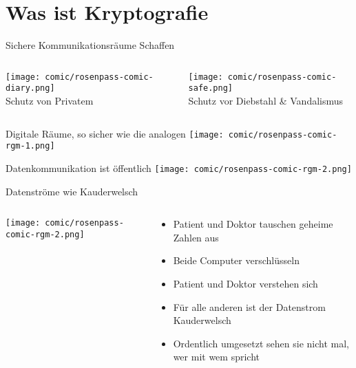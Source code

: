 \section{Was ist Kryptografie}


\begin{frame}[T]{Sichere Kommunikationsräume Schaffen}
  \begin{columns}[t,fullwidth]
    \hfill
    \begin{column}{.35\linewidth}
      \centering
      \texttt{[image: comic/rosenpass-comic-diary.png]}   
      \\ Schutz von Privatem
    \end{column}
    \begin{column}{.55\linewidth}
      \centering
      \texttt{[image: comic/rosenpass-comic-safe.png]}   
      \\ Schutz vor Diebstahl \& Vandalismus
    \end{column}
    \hfill
  \end{columns}
\end{frame}

\begin{frame}[T]{Digitale Räume, so sicher wie die analogen}
  \texttt{[image: comic/rosenpass-comic-rgm-1.png]}
\end{frame}

\begin{frame}[T]{Datenkommunikation ist öffentlich}
  \texttt{[image: comic/rosenpass-comic-rgm-2.png]}
\end{frame}

\begin{frame}[T]{Datenströme wie Kauderwelsch}
  \begin{columns}[T,fullwidth]
    \hfill
    \begin{column}{.55\linewidth}
      \texttt{[image: comic/rosenpass-comic-rgm-2.png]}
    \end{column}
    \begin{column}{.38\linewidth}
      \vspace{2.3em}
      \begin{itemize}
        \item Patient und Doktor tauschen geheime Zahlen aus
        \item Beide Computer verschlüsseln
        \item Patient und Doktor verstehen sich
        \item Für alle anderen ist der Datenstrom Kauderwelsch
        \item Ordentlich umgesetzt sehen sie nicht mal, wer mit wem spricht
      \end{itemize}
    \end{column}
    \hfill
  \end{columns}
\end{frame}


